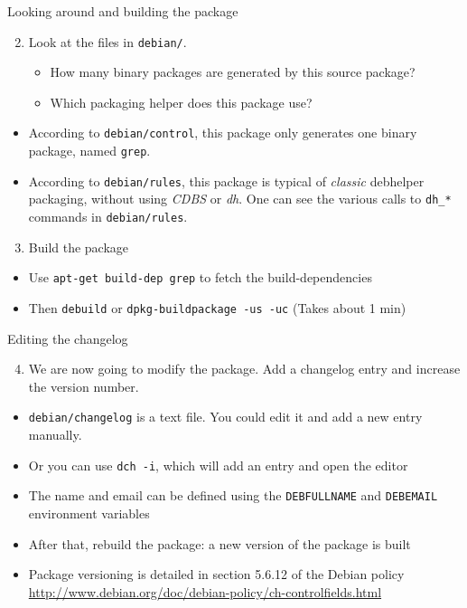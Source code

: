 \documentclass[10pt,final]{beamer}
\begin{document}
\begin{frame}{Looking around and building the package}
	\begin{enumerate}
			\setcounter{enumi}{1}
	\item Look at the files in \texttt{debian/}.
		\begin{itemize}
			\item 		How many binary packages are generated by this source package?
			\item 		Which packaging helper does this package use?
		\end{itemize}
	\end{enumerate}
	\hbr
	\begin{itemize}
		\item According to \texttt{debian/control}, this package only generates one binary package, named \texttt{grep}.
			\hbr
		\item According to \texttt{debian/rules}, this package is typical of \textsl{classic} debhelper packaging, without using \textsl{CDBS} or \textsl{dh}. One can see the various calls to \texttt{dh\_*} commands in \texttt{debian/rules}.
	\end{itemize}
	\hbr
	\begin{enumerate}
			\setcounter{enumi}{2}

		\item Build the package
	\end{enumerate}
	\hbr
	\begin{itemize}
		\item Use \texttt{apt-get build-dep grep} to fetch the build-dependencies
		\item Then \texttt{debuild} or \texttt{dpkg-buildpackage -us -uc} (Takes about 1 min)
	\end{itemize}
\end{frame}

\begin{frame}{Editing the changelog}
	\begin{enumerate}
			\setcounter{enumi}{3}

	\item We are now going to modify the package. Add a changelog entry and increase the version number.
	\end{enumerate}
	\hbr
	\begin{itemize}
		\item \texttt{debian/changelog} is a text file. You could edit it and add a new entry manually.
	\hbr
		\item Or you can use \texttt{dch -i}, which will add an entry and open the editor
	\hbr
		\item The name and email can be defined using the \texttt{DEBFULLNAME} and \texttt{DEBEMAIL} environment variables
	\hbr
		\item After that, rebuild the package: a new version of the package is built
	\hbr
		\item Package versioning is detailed in section 5.6.12 of the Debian policy\\
			\url{http://www.debian.org/doc/debian-policy/ch-controlfields.html}
	\end{itemize}
\end{frame}
\end{document}
